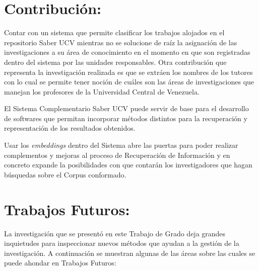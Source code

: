 \documentclass[
  12pt,
  openany]{book}
\begin{document}
\hypertarget{conclusionescontri}{%
\section{Contribución:}\label{conclusionescontri}}

Contar con un sistema que permite clasificar los trabajos alojados en el repositorio Saber UCV mientras no se solucione de raíz la asignación de las investigaciones a su área de conocimiento en el momento en que son registradas dentro del sistema por las unidades responsables. Otra contribución que representa la investigación realizada es que se extráen los nombres de los tutores con lo cual se permite tener noción de cuáles son las áreas de investigaciones que manejan los profesores de la Universidad Central de Venezuela.

El Sistema Complementario Saber UCV puede servir de base para el desarrollo de softwares que permitan incorporar métodos distintos para la recuperación y representación de los resultados obtenidos.

Usar los \emph{embeddings} dentro del Sistema abre las puertas para poder realizar complementos y mejoras al proceso de Recuperación de Información y en concreto expande la posibilidades con que contarán los investigadores que hagan búsquedas sobre el Corpus conformado.

\hypertarget{conclusionestrabafutu}{%
\section{Trabajos Futuros:}\label{conclusionestrabafutu}}

La investigación que se presentó en este Trabajo de Grado deja grandes inquietudes para inspeccionar nuevos métodos que ayudan a la gestión de la investigación. A continuación se muestran algunas de las áreas sobre las cuales se puede ahondar en Trabajos Futuros:
\end{document}
